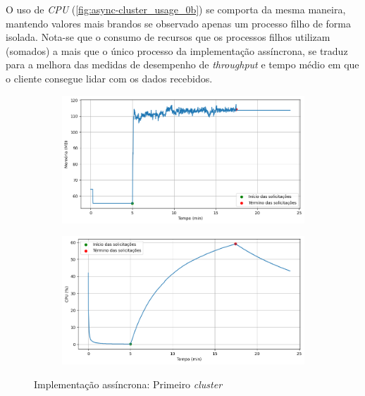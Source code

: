 \documentclass[12pt]{article}
\begin{document}
O uso de \textit{CPU} (\autoref{fig:async-cluster_usage_0b}) se comporta da mesma
maneira, mantendo valores mais brandos se observado apenas um processo filho de forma isolada.
Nota-se que o consumo de recursos que os processos filhos utilizam (somados) a mais que o único processo
da implementação assíncrona, se traduz para a melhora das medidas de desempenho de 
\textit{throughput} e tempo médio em que o cliente consegue lidar com os dados recebidos.


\begin{figure}[H]
	\centering
	\begin{subfigure}[H]{0.45\textwidth}
			\centering
			\label{fig:async-cluster_usage_0a}
			\includegraphics[width=1\textwidth]{images/pt-br/results/async-cluster_memory_usage_0.png}
	\end{subfigure}
	\hfill%
	\begin{subfigure}[H]{0.45\textwidth}
			\centering
			\label{fig:async-cluster_usage_0b}
			\includegraphics[width=1\textwidth]{images/pt-br/results/async-cluster_cpu_usage_0.png}
	\end{subfigure}
	
	\caption{Implementação assíncrona: Primeiro \textit{cluster}}\label{fig:async-cluster_usage_0}
\end{figure}
\end{document}
